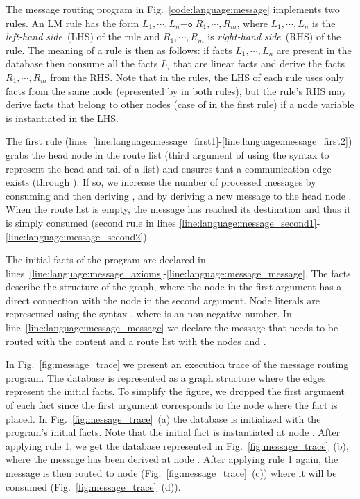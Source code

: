 The message routing program in Fig.~\ref{code:language:message} implements two
rules. An LM rule has the form $L_1, \cdots, L_n \mathtt{-o} \; R_1, \cdots,
R_m$, where $L_1, \cdots, L_n$ is the \emph{left-hand side}~(LHS) of the rule
and $R_1, \cdots, R_m$ is \emph{right-hand side}~(RHS) of the rule. The meaning
of a rule is then as follows: if facts $L_1, \cdots, L_n$ are present in the
database then consume all the facts $L_i$ that are linear facts and derive the
facts $R_1, \cdots, R_m$ from the RHS. Note that in the rules, the LHS of each
rule uses only facts from the same node (epresented by  in both rules),
but the rule's RHS may derive facts that belong to other nodes (case of 
in the first rule) if a node variable is instantiated in the LHS.

The first rule
(lines~\ref{line:language:message_first1}-\ref{line:language:message_first2})
grabs the head node  in the route list (third argument of 
using the syntax \code{[B | L]} to represent the head and tail of a list) and
ensures that a communication edge exists (through ). If so, we
increase the number of processed messages by consuming 
and then deriving , and by deriving a new message to
the head node .  When the route list is empty, the message has reached
its destination and thus it is simply consumed (second rule in lines
\ref{line:language:message_second1}-\ref{line:language:message_second2}).

The initial facts of the program are declared in
lines~\ref{line:language:message_axioms}-\ref{line:language:message_message}.
The  facts describe the structure of the graph, where the node in the
first argument has a direct connection with the node in the second argument.
Node literals are represented using the syntax , where  is an
non-negative number. In line~\ref{line:language:message_message} we declare the
message that needs to be routed with the content  and a
route list with the nodes  and .

In Fig.~\ref{fig:message_trace} we present an execution trace of the message
routing program. The database is represented as a graph structure where the
edges represent the  initial facts. To simplify the figure, we
dropped the first argument of each fact since the first argument corresponds to
the node where the fact is placed. In Fig.~\ref{fig:message_trace}~(a) the
database is initialized with the program's initial facts. Note that the initial
 fact is instantiated at node . After applying rule 1, we
get the database represented in Fig.~\ref{fig:message_trace}~(b), where the
message has been derived at node . After applying rule 1 again, the
message is then routed to node  (Fig.~\ref{fig:message_trace}~(c))
where it will be consumed (Fig.~\ref{fig:message_trace}~(d)).

